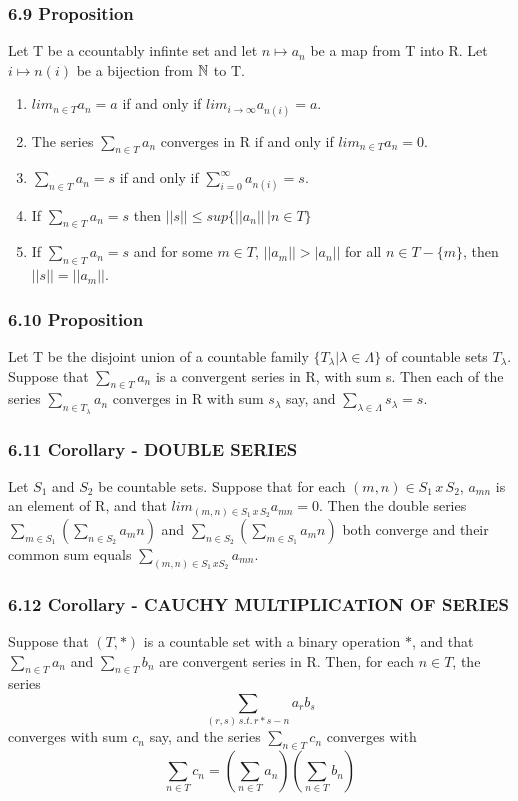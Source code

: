 \subsubsection*{6.9 Proposition}
Let T be a ccountably infinte set and let $n\mapsto a_n$ be a map from T into R. Let $i\mapsto n(i)$ be a bijection from $\mathbb N$ to T.
\begin{enumerate}
\item $lim_{n\in T} a_n = a$ if and only if $lim_{i\rightarrow \infty} a_{n(i)} = a $.
\item The series $\sum_{n\in T} a_n$ converges in R if and only if $lim_{n\in T}a_n = 0$.
\item $\sum_{n\in T} a_n = s $ if and only if $\sum_{i=0}^\infty a_{n(i)} =  s$.
\item If $\sum_{n\in T}a_n = s$ then $||s||\leq sup \{ ||a_n||\, | n\in T\}$
\item If  $\sum_{n\in T}a_n = s$ and for some $m\in T$, $||a_m||>|a_n||$ for all $n\in T - \{m\}$, then $||s|| = ||a_m||$.
\end{enumerate}


\subsubsection*{6.10 Proposition}
Let T be the disjoint union of a countable family $\{T_\lambda |\lambda\in\Lambda\}$ of countable sets $T_\lambda$. Suppose that $\sum_{n\in T}a_n$ is a convergent series in R, with sum s. Then each of the series $\sum_{n\in T_\lambda} a_n$ converges in R with sum $s_\lambda$ say, and $\sum_{\lambda\in \Lambda} s_\lambda = s$.

\subsubsection*{6.11 Corollary - DOUBLE SERIES}
Let $S_1$ and $S_2$ be countable sets. Suppose that for each $(m,n)\in S_1\, x\, S_2$, $a_{mn}$ is an element of R, and that $lim_{(m,n)\in S_1\, x \, S_2}a_{mn} = 0$. Then the double series $\sum_{m\in S_1}(\sum_{n\in S_2}a_mn)$ and  $\sum_{n\in S_2}(\sum_{m\in S_1}a_mn)$ both converge and their common sum equals $\sum_{(m,n)\in S_1\, x S_2} a_{mn}$.

\subsubsection*{6.12 Corollary - CAUCHY MULTIPLICATION OF SERIES}
Suppose that $(T, *)$ is a countable set with a binary operation $*$, and that $\sum_{n\in T} a_n$ and $\sum_{n\in T}b_n$ are convergent series in R. Then, for each $n\in T$, the series 
$$\sum_{(r,s)\,s.t.\, r*s - n} a_rb_s$$
converges with sum $c_n$ say, and the series $\sum_{n\in T}c_n$ converges with 
$$\sum_{n\in T}c_n = (\sum_{n\in T}a_n)(\sum_{n\in T}b_n)$$

